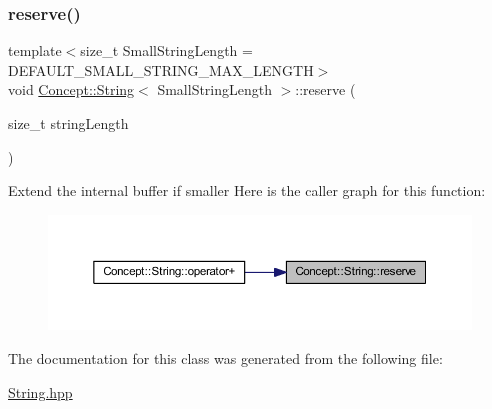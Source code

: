\subsubsection{\texorpdfstring{reserve()}{reserve()}}
{\footnotesize\ttfamily template$<$size\+\_\+t Small\+String\+Length = D\+E\+F\+A\+U\+L\+T\+\_\+\+S\+M\+A\+L\+L\+\_\+\+S\+T\+R\+I\+N\+G\+\_\+\+M\+A\+X\+\_\+\+L\+E\+N\+G\+TH$>$ \\
void \mbox{\hyperlink{class_concept_1_1_string}{Concept\+::\+String}}$<$ Small\+String\+Length $>$\+::reserve (\begin{DoxyParamCaption}\item[{size\+\_\+t}]{string\+Length }\end{DoxyParamCaption})\hspace{0.3cm}{\ttfamily [inline]}}

Extend the internal buffer if smaller Here is the caller graph for this function\+:\nopagebreak
\begin{figure}[H]
\begin{center}
\leavevmode
\includegraphics[width=350pt]{class_concept_1_1_string_a6b828c71bd29fbc4f965f4abde5eeb4f_icgraph}
\end{center}
\end{figure}


The documentation for this class was generated from the following file\+:\begin{DoxyCompactItemize}
\item 
\mbox{\hyperlink{_string_8hpp}{String.\+hpp}}\end{DoxyCompactItemize}
